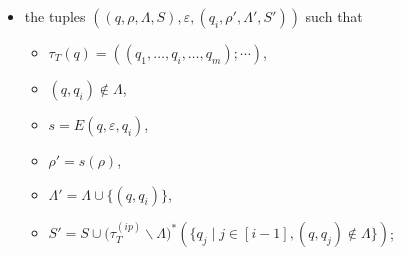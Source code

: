 \begin{itemize}
\begin{itemize}
\begin{itemize}
                                    \end{itemize}
                                \item the tuples $((q, \rho, \Lambda, S), \varepsilon, (q_i, \rho', \Lambda', S'))$ such that
                                    \begin{itemize}
                                        \item $\tau_T(q) = ((q_1, \ldots, q_i, \ldots, q_m); \cdots)$,
                                        \item $(q, q_i) \not \in \Lambda$,

                                        \item $s = E(q, \varepsilon, q_i)$,
                                        \item $\rho' = s(\rho)$,
                                        \item $\Lambda' = \Lambda \cup \{(q, q_i)\}$,
                                        \item $S' =  S \cup \big(\tau^{(ip)}_T \backslash \Lambda \big)^\ast(\{ q_j \mid j \in [i-1], (q, q_j) \not \in \Lambda \})$;
                                    \end{itemize}


\end{itemize}
\end{itemize}
